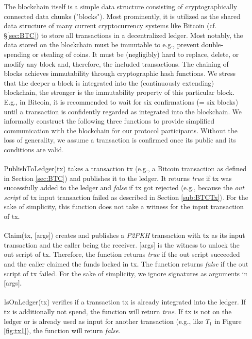 \documentclass{cacthesis}
\newcounter{protocol}
\begin{document}
        The blockchain itself is a simple data structure consisting of cryptographically connected data chunks ("blocks"). Most prominently, it is utilized as the shared data structure of many current cryptocurrency systems like Bitcoin (cf. §\ref{sec:BTC}) to store all transactions in a decentralized ledger. Most notably, the data stored on the blockchain must be immutable to e.g., prevent double-spending or stealing of coins. It must be (negligibly) hard to replace, delete, or modify any block and, therefore, the included transactions. The chaining of blocks achieves immutability through cryptographic hash functions. We stress that the deeper a block is integrated into the (continuously extending) blockchain, the stronger is the immutability property of this particular block. E.g., in Bitcoin, it is recommended to wait for six confirmations (= six blocks) until a transaction is confidently regarded as integrated into the blockchain. We informally construct the following three functions to provide simplified communication with the blockchain for our protocol participants. Without the loss of generality, we assume a transaction is confirmed once its public and its conditions are valid. \\\\ 
        \textsf{PublishToLedger(tx)} takes a transaction \textsf{tx} (e.g., a Bitcoin transaction as defined in Section \ref{sec:BTC}) and publishes it to the ledger. It returns \textit{true} if \textsf{tx} was successfully added to the ledger and \textit{false} if \textsf{tx} got rejected (e.g., because the \textit{out script} of \textsf{tx} input transaction failed as described in Section \ref{sub:BTCTx}). For the sake of simplicity, this function does not take a witness for the input transaction of  \textsf{tx}. \\\\ 
        \textsf{Claim(tx, [args])} creates and publishes a \textit{P2PKH} transaction with \textsf{tx} as its input transaction and the caller being the receiver. \textsf{[args]} is the witness to unlock the out script of \textsf{tx}. Therefore, the function returns \textit{true} if the out script succeeded and the caller claimed the funds locked in \textsf{tx}. The function returns \textit{false} if the out script of \textsf{tx} failed. For the sake of simplicity, we ignore signatures as arguments in \textsf{[args]}.\\\\ 
        \textsf{IsOnLedger(tx)} verifies if a transaction \textsf{tx} is already integrated into the ledger. If \textsf{tx} is additionally not spend, the function will return \textit{true}. If \textsf{tx} is not on the ledger or is already used as input for another transaction (e.g., like $T_1$ in Figure \ref{fig:tx1}), the function will return \textit{false}.
        
\end{document}
